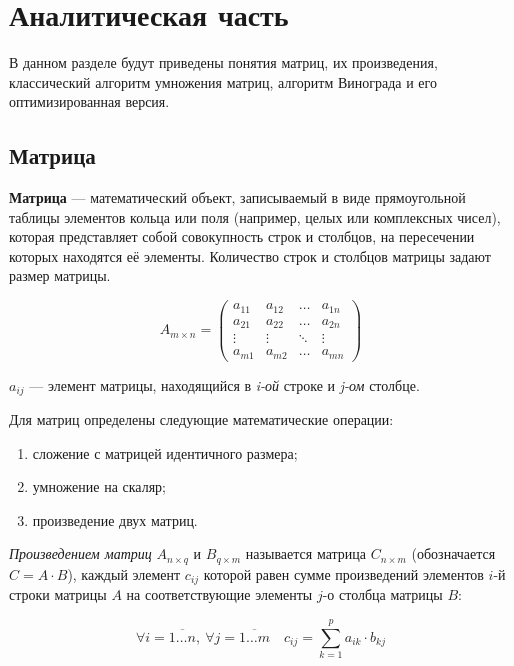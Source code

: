 \chapter{Аналитическая часть}

В данном разделе будут приведены понятия матриц, их произведения, классический алгоритм умножения матриц, алгоритм Винограда и его оптимизированная версия.

\section{Матрица}

\textbf{Матрица} --- математический объект, записываемый в виде прямоугольной таблицы элементов кольца или поля (например, целых или комплексных чисел), которая представляет собой совокупность строк и столбцов, на пересечении которых находятся её элементы. Количество строк и столбцов матрицы задают размер матрицы.~\cite{book:matrix}

\begin{equation}
	A_{m \times n} =
	\begin{pmatrix}
		a_{11} & a_{12} & \ldots & a_{1n}\\
		a_{21} & a_{22} & \ldots & a_{2n}\\
		\vdots & \vdots & \ddots & \vdots\\
		a_{m1} & a_{m2} & \ldots & a_{mn}
	\end{pmatrix}
	\label{equ:matrix_definition}
\end{equation}

$a_{ij}$ --- элемент матрицы, находящийся в \textit{i-ой} строке и \textit{j-ом} столбце.


Для матриц определены следующие математические операции:
\begin{enumerate}[label={\arabic*)}]
	\item сложение с матрицей идентичного размера;
	\item умножение на скаляр;
	\item произведение двух матриц.
\end{enumerate}

\emph{Произведением матриц} $A_{n \times q}$ и $B_{q \times m}$ называется матрица $C_{n \times m}$ (обозначается $C = A \cdot B$), каждый элемент $c_{ij}$ которой равен сумме произведений элементов $i$-й строки матрицы $A$ на соответствующие элементы $j$-о столбца матрицы $B$:

\begin{equation}
	\forall i = \overline{1 \ldots n},\ \forall j = \overline{1 \ldots m} \quad c_{ij} = \sum_{k=1}^{p} a_{ik} \cdot b_{kj}
	\label{equ:matrix_product}
\end{equation}

